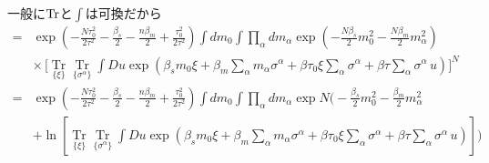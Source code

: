 \documentclass{ltjsarticle}
\begin{document}
一般に$\Tr$と$\int$は可換だから
\begin{align}
    =&\exp(-\frac{N\tau_0^2}{2\tau^2}-\frac{\beta_s}{2}-\frac{n\beta_m}{2} +\frac{\tau_0^2}{2\tau^2})\int dm_0 \int \prod_\alpha dm_\alpha \exp\left(-\frac{N\beta_s}{2}m_0^2 -\frac{N\beta_m}{2}m_\alpha^2 \right)\\
     &\times \,\bigg[\mathop{\mathrm{Tr}}\limits_{\{\xi\}}\mathop{\mathrm{Tr}}\limits_{\{\sigma^\alpha\}} \int Du \exp\left(\beta_s m_0\xi +\beta_m \sum_\alpha m_\alpha\sigma^\alpha+\beta\tau_0 \xi \displaystyle\sum_\alpha\sigma^\alpha +\beta\tau \displaystyle\sum_\alpha\sigma^\alpha \, u \right)\bigg]^N\\
         =&\exp(-\frac{N\tau_0^2}{2\tau^2}-\frac{\beta_s}{2}-\frac{n\beta_m}{2} +\frac{\tau_0^2}{2\tau^2})\int dm_0 \int \prod_\alpha dm_\alpha \exp N\bigg(-\frac{\beta_s}{2}m_0^2 -\frac{\beta_m}{2}m_\alpha^2 \\ 
     &+\ln \left[\mathop{\mathrm{Tr}}\limits_{\{\xi\}}\mathop{\mathrm{Tr}}\limits_{\{\sigma^\alpha\}} \int Du \exp\left(\beta_s m_0\xi +\beta_m \sum_\alpha m_\alpha\sigma^\alpha+\beta\tau_0 \xi \displaystyle\sum_\alpha\sigma^\alpha +\beta\tau \displaystyle\sum_\alpha\sigma^\alpha \, u \right)\right]\bigg)\\
\end{align}
\end{document}

